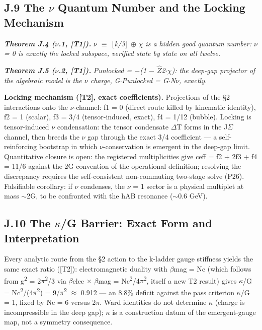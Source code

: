 \documentclass[11pt,letterpaper]{article}
\begin{document}
\subsection*{J.9  The $\nu$ Quantum Number and the Locking Mechanism}

\noindent \textbf{\textit{Theorem J.4 ($\nu$.1, [T1]). }}\textit{$\nu$ $\equiv$ $\lfloor$k/3$\rfloor$ $\oplus$ $\chi$ is a hidden good quantum number: $\nu$ = 0 is exactly the locked subspace, verified state by state on all twelve.}

\noindent \textbf{\textit{Theorem J.5 ($\nu$.2, [T1]). }}\textit{Punlocked = $-$(1 $-$ $\hat{Z}$2$\cdot$$\chi$): the deep-gap projector of the algebraic model is the $\nu$ charge, G$\cdot$Punlocked = G$\cdot$N$\nu$, exactly.}

\noindent \textbf{Locking mechanism ([T2], exact coefficients). }Projections of the §2 interactions onto the $\nu$-channel: f1 = 0 (direct route killed by kinematic identity), f2 = 1 (scalar), f3 = 3/4 (tensor-induced, exact), f4 = 1/12 (bubble). Locking is tensor-induced $\nu$ condensation: the tensor condensate $\Delta$T forms in the J$\Sigma$ channel, then breeds the $\nu$ gap through the exact 3/4 coefficient --- a self-reinforcing bootstrap in which $\nu$-conservation is emergent in the deep-gap limit. Quantitative closure is open: the registered multiplicities give ceff = f2 + 2f3 + f4 = 11/6 against the 2G convention of the operational definition; resolving the discrepancy requires the self-consistent non-commuting two-stage solve (P26). Falsifiable corollary: if $\nu$ condenses, the $\nu$ = 1 sector is a physical multiplet at mass $\sim$2G, to be confronted with the hAB resonance ($\sim$0.6 GeV).

\subsection*{J.10  The $\kappa$/G Barrier: Exact Form and Interpretation}

\noindent Every analytic route from the §2 action to the k-ladder gauge stiffness yields the same exact ratio ([T2]): electromagnetic duality with $\beta$mag = Nc (which follows from g\textsuperscript{2} = 2$\pi$\textsuperscript{2}/3 via $\beta$elec $\times$ $\beta$mag = Nc\textsuperscript{2}/4$\pi$\textsuperscript{2}, itself a new T2 result) gives $\kappa$/G = Nc\textsuperscript{2}/(4$\pi$\textsuperscript{2}) = 9/$\pi$\textsuperscript{2} $\approx$ 0.912 --- an 8.8\% deficit against the pass criterion $\kappa$/G = 1, fixed by Nc = 6 versus 2$\pi$. Ward identities do not determine $\kappa$ (charge is incompressible in the deep gap); $\kappa$ is a construction datum of the emergent-gauge map, not a symmetry consequence.
\end{document}
